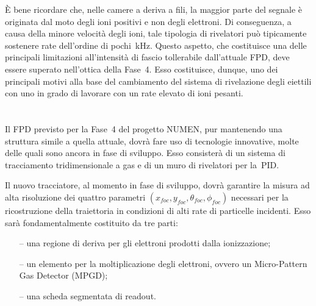 È bene ricordare che, nelle camere a deriva a fili, la maggior parte del segnale è originata dal moto degli ioni positivi e non degli elettroni.
Di conseguenza, a causa della minore velocità degli ioni, tale tipologia di rivelatori può tipicamente sostenere rate dell'ordine di pochi~kHz. 
Questo aspetto, che costituisce una delle principali limitazioni all'intensità di fascio tollerabile dall'attuale FPD, deve essere superato nell'ottica della Fase~4. 
Esso costituisce, dunque, uno dei principali motivi alla base del cambiamento del sistema di rivelazione degli eiettili con uno in grado di lavorare con un rate elevato di ioni pesanti. 

\vspace{0.5 cm}

\section{}




Il FPD previsto per la Fase~4 del progetto NUMEN, pur mantenendo una struttura simile a quella attuale, dovrà fare uso di tecnologie innovative, molte delle quali sono ancora in fase di sviluppo.
Esso consisterà di un sistema di tracciamento tridimensionale a gas e di un muro di rivelatori per la~PID.


Il nuovo tracciatore, al momento in fase di sviluppo, dovrà garantire la misura ad alta risoluzione dei quattro parametri $ \left(  x_{foc}, y_{foc}, \theta_{foc}, \phi_{foc}  \right)$ necessari per la ricostruzione della traiettoria in condizioni di alti rate di particelle incidenti. 
Esso sarà fondamentalmente costituito da tre parti:
\begin{itemize}
	\item[--] una regione di deriva per gli elettroni prodotti dalla ionizzazione;
	\item[--] un elemento per la moltiplicazione degli elettroni, ovvero un Micro-Pattern Gas Detector (MPGD);
	\item[--] una scheda segmentata di readout.
\end{itemize}

